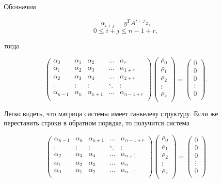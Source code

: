 Обозначим

	$$ \alpha_{i+j} = y^T A^{i+j} z, $$
	$$ 0 \le i+j \le n-1+r, $$

тогда

	$$
		\begin{pmatrix}
			\alpha_0     & \alpha_1 & \alpha_2     & \ldots & \alpha_r \\
			\alpha_1     & \alpha_2 & \alpha_3     & \ldots & \alpha_{1+r} \\
			\alpha_2     & \alpha_3 & \alpha_4     & \ldots & \alpha_{2+r} \\
			\vdots       & \vdots   & \vdots       & \ddots & \vdots \\
			\alpha_{n-1} & \alpha_n & \alpha_{n+1} & \ldots & \alpha_{n-1+r} \\
		\end{pmatrix}
		\begin{pmatrix}
			\rho_0 \\
			\rho_1 \\
			\rho_2 \\
			\vdots \\
			\rho_r \\
		\end{pmatrix}
		=
		\begin{pmatrix}
			0 \\
			0 \\
			0 \\
			\vdots \\
			0 \\
		\end{pmatrix}
		.
	$$

Легко видеть, что матрица системы имеет ганкелеву структуру. Если же переставить строки в обратном порядке, то получится система

	$$
		\begin{pmatrix}
			\alpha_{n-1} & \alpha_n & \alpha_{n+1} & \ldots & \alpha_{n-1+r} \\
			\vdots       & \vdots   & \vdots       & \ddots & \vdots \\
			\alpha_2     & \alpha_3 & \alpha_4     & \ldots & \alpha_{n+1} \\
			\alpha_1     & \alpha_2 & \alpha_3     & \ldots & \alpha_n \\
			\alpha_0     & \alpha_1 & \alpha_2     & \ldots & \alpha_{n-1} \\
		\end{pmatrix}
		\begin{pmatrix}
			\rho_0 \\
			\rho_1 \\
			\rho_2 \\
			\vdots \\
			\rho_r \\
		\end{pmatrix}
		=
		\begin{pmatrix}
			0 \\
			0 \\
			0 \\
			\vdots \\
			0 \\
		\end{pmatrix}
	$$

